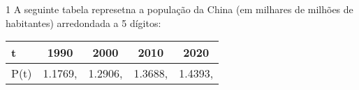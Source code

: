 \documentclass[\mainfilename]{subfiles}
\begin{document}
\setcounter{question}{17}

\begin{questionBox}1{ %
    A seguinte tabela represetna a população da China (em milhares de milhões de habitantes) arredondada a 5 dígitos:
} %
    \begin{center}
        \vspace{1ex}
        \begin{tabular}{L || *{4}{C}}
            
                t & 1990 & 2000 & 2010 & 2020
            
            \\\hline
            
                P(t) 
                & 1.1769,
                & 1.2906,
                & 1.3688,
                & 1.4393,
            

\end{tabular}
\end{center}
\end{questionBox}
\end{document}
